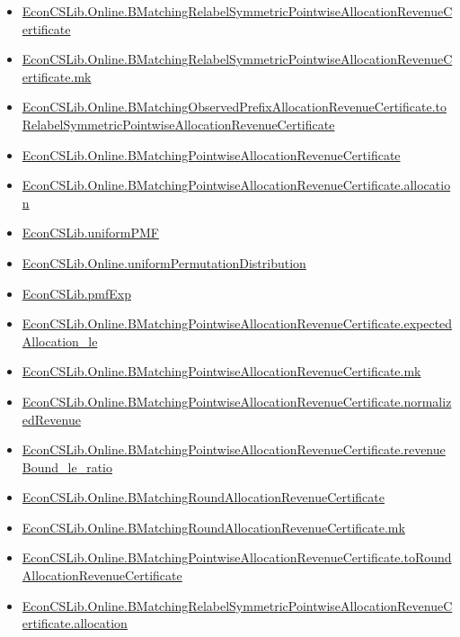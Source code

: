 \documentclass[10pt]{article}
\begin{document}
\begin{itemize}[leftmargin=1.2em]
\begin{itemize}[leftmargin=1.2em]
\item \hyperlink{library-prerequisite-6a25f4757fb5e65a}{EconCSLib.Online.BMatchingRelabelSymmetricPointwiseAllocationRevenueCertificate}
\item \hyperlink{library-prerequisite-54e7d768d85cadbb}{EconCSLib.Online.BMatchingRelabelSymmetricPointwiseAllocationRevenueCertificate.mk}
\item \hyperlink{library-prerequisite-f3043d6da81b30d0}{EconCSLib.Online.BMatchingObservedPrefixAllocationRevenueCertificate.toRelabelSymmetricPointwiseAllocationRevenueCertificate}
\item \hyperlink{library-prerequisite-e19a9ba9e127c173}{EconCSLib.Online.BMatchingPointwiseAllocationRevenueCertificate}
\item \hyperlink{library-prerequisite-94eec6bcd6845e34}{EconCSLib.Online.BMatchingPointwiseAllocationRevenueCertificate.allocation}
\item \hyperlink{library-prerequisite-00a2add8d3a6edfc}{EconCSLib.uniformPMF}
\item \hyperlink{library-prerequisite-ec3838ac6010642a}{EconCSLib.Online.uniformPermutationDistribution}
\item \hyperlink{library-prerequisite-e5c7eedc40c11b7a}{EconCSLib.pmfExp}
\item \hyperlink{library-prerequisite-5fcdfd616e61032d}{EconCSLib.Online.BMatchingPointwiseAllocationRevenueCertificate.expectedAllocation\_le}
\item \hyperlink{library-prerequisite-2bc2ea42ac58b036}{EconCSLib.Online.BMatchingPointwiseAllocationRevenueCertificate.mk}
\item \hyperlink{library-prerequisite-40abf30b37e742eb}{EconCSLib.Online.BMatchingPointwiseAllocationRevenueCertificate.normalizedRevenue}
\item \hyperlink{library-prerequisite-00fe39c0adcd2464}{EconCSLib.Online.BMatchingPointwiseAllocationRevenueCertificate.revenueBound\_le\_ratio}
\item \hyperlink{library-prerequisite-59680b4906bd5b1d}{EconCSLib.Online.BMatchingRoundAllocationRevenueCertificate}
\item \hyperlink{library-prerequisite-354bc71a1b15ba6e}{EconCSLib.Online.BMatchingRoundAllocationRevenueCertificate.mk}
\item \hyperlink{library-prerequisite-bd1125366a9e9513}{EconCSLib.Online.BMatchingPointwiseAllocationRevenueCertificate.toRoundAllocationRevenueCertificate}
\item \hyperlink{library-prerequisite-7838ae4d39079643}{EconCSLib.Online.BMatchingRelabelSymmetricPointwiseAllocationRevenueCertificate.allocation}

\end{itemize}
\end{itemize}
\end{document}
